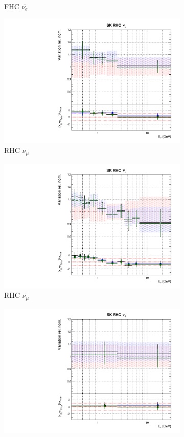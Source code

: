 \begin{figure}[!htbp]
\begin{subfigure}{0.45\textwidth}
  \caption{\SK FHC $\bar{\nu_{e}}$}
\end{subfigure}
\begin{subfigure}{0.45\textwidth}
  \centering
  \includegraphics[width=0.75\linewidth]{figs/polydataflux_12}
  \caption{\SK RHC $\nu_{\mu}$}
\end{subfigure}
\begin{subfigure}{0.45\textwidth}
  \centering
  \includegraphics[width=0.75\linewidth]{figs/polydataflux_13}
  \caption{\SK RHC $\bar{\nu_{\mu}}$}
\end{subfigure}
\begin{subfigure}{0.45\textwidth}
  \centering
  \includegraphics[width=0.75\linewidth]{figs/polydataflux_14}

\end{subfigure}
\end{figure}
